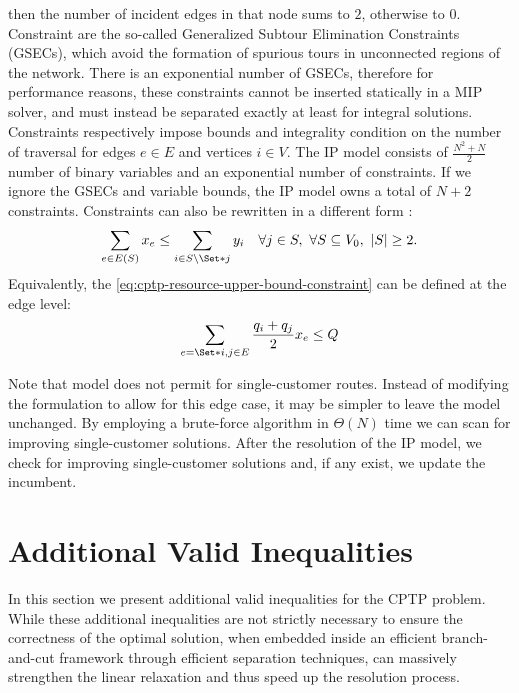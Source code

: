 then the number of incident edges in that node sums to $2$, otherwise to $0$.
Constraint 
are the so-called Generalized Subtour Elimination Constraints (GSECs),
which avoid the formation of spurious tours in unconnected regions of the network.
There is an exponential number of GSECs,
therefore for performance reasons,
these constraints cannot be inserted statically in a MIP solver,
and must instead be separated exactly at least for integral solutions.
Constraints  respectively
impose bounds and integrality condition
on the number of traversal for edges $e \in E$ and vertices $i \in V$.
The IP model consists of $\frac{N^2 + N}{2}$ number of binary variables and an exponential number of constraints.
If we ignore the GSECs and variable bounds, the IP model owns a total of $N + 2$ constraints.
Constraints 
can also be rewritten in a different form \parencite{wolsey2020integer}:
\begin{equation}
	\label{eq:cptp-gsec-constraints-v2}
	\sum\limits_{e \in E(S)} x_e \le \sum\limits_{i \in S \setminus \Set*{j}} y_i \quad \forall j \in S,\ \forall S \subseteq V_0,\ |S| \ge 2.
\end{equation}
Equivalently,
the \cref{eq:cptp-resource-upper-bound-constraint}
can be defined at the edge level:
\begin{equation}
	\sum_{e = \Set*{i, j} \in E} \frac{q_i + q_j}{2} x_e \le Q
\end{equation}

Note that model
does not permit for single-customer routes.
Instead of modifying the formulation to allow for this edge case,
it may be simpler to leave the model unchanged.
By employing a brute-force algorithm in $\Theta(N)$ time we can scan for improving single-customer solutions.
After the resolution of the IP model,
we check for improving single-customer solutions and,
if any exist,
we update the incumbent.

\section{Additional Valid Inequalities}
\label{sec:cptp-additional-valid-inequalities}

In this section we present additional valid inequalities for the CPTP problem.
While these additional inequalities are not strictly necessary
to ensure the correctness of the optimal solution,
when embedded inside an efficient branch-and-cut framework through efficient separation techniques,
can massively strengthen the linear relaxation and thus speed up the resolution process.

